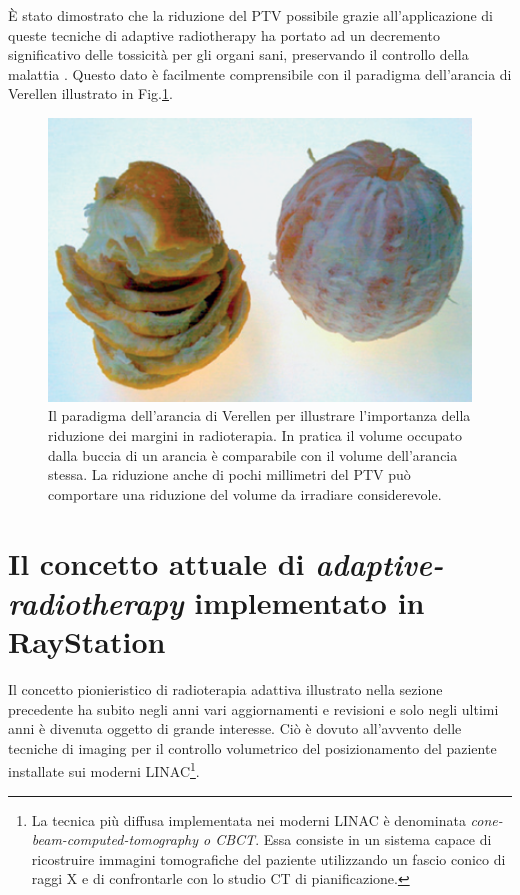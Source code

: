 \`E stato dimostrato che la riduzione del PTV possibile grazie all'applicazione di queste tecniche di adaptive radiotherapy ha portato ad un decremento significativo delle tossicità per gli organi sani, preservando il controllo della malattia \cite{Park2012}. Questo dato è facilmente comprensibile con il paradigma dell'arancia di Verellen \cite{Verellen2007} illustrato in Fig.\ref{fig:verellen}.
\begin{figure}[!t]
\centering
\includegraphics[width=.6\textwidth]{./cap3/Verellen.png}
\caption{Il paradigma dell'arancia di Verellen \cite{Verellen2007} per illustrare l'importanza della riduzione dei margini in radioterapia. In pratica il volume occupato dalla buccia di un arancia è comparabile con il volume dell'arancia stessa. La riduzione anche di pochi millimetri del PTV può comportare una riduzione del volume da irradiare considerevole.}
\label{fig:verellen}
\end{figure}



\section{Il concetto attuale di \textit{adaptive-radiotherapy} implementato in RayStation}
Il concetto pionieristico di radioterapia adattiva illustrato nella sezione precedente ha subito negli anni vari aggiornamenti e revisioni e solo negli ultimi anni è divenuta oggetto di grande interesse. Ciò è dovuto all'avvento  delle tecniche di imaging per il controllo volumetrico del posizionamento del paziente installate sui moderni LINAC\footnote{La tecnica più diffusa implementata nei moderni LINAC è denominata \textit{cone-beam-computed-tomography o CBCT}. Essa consiste in un sistema capace di ricostruire immagini tomografiche del paziente utilizzando un fascio conico di raggi X e di confrontarle con lo studio CT di pianificazione.}.

